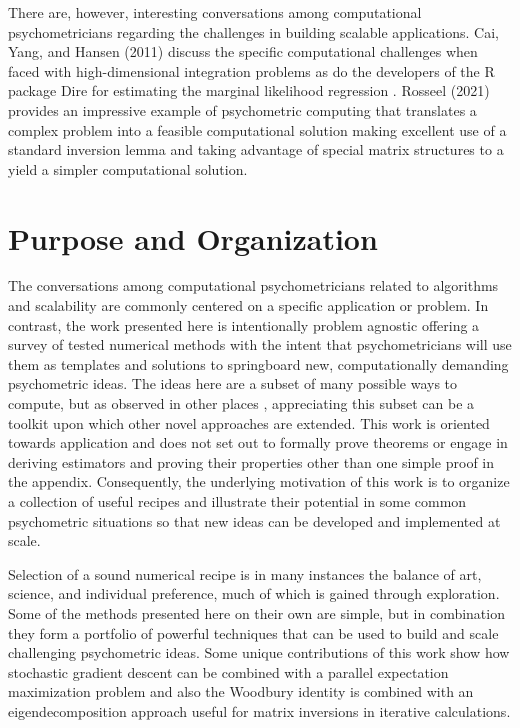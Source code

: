 \documentclass[12pt]{article}
\begin{document}
There are, however, interesting conversations among computational psychometricians regarding the challenges in building scalable applications. Cai, Yang, and Hansen (2011) discuss the specific computational challenges when faced with high-dimensional integration problems as do the developers of the R package Dire \cite{dire} for estimating the marginal likelihood regression \cite{mislevy}. Rosseel (2021) provides an impressive example of psychometric computing that translates a complex problem into a feasible computational solution making excellent use of a standard inversion lemma and taking advantage of special matrix structures to a yield a simpler computational solution.  \nocite{cai} \nocite{psych3020017}

\section*{Purpose and Organization}
The conversations among computational psychometricians related to algorithms and scalability are commonly centered on a specific application or problem. In contrast, the work presented here is intentionally problem agnostic offering a survey of tested numerical methods with the intent that psychometricians will use them as templates and solutions to springboard new, computationally demanding psychometric ideas. The ideas here are a subset of many possible ways to compute, but as observed in other places \cite{cai:fisher}, appreciating this subset can be a toolkit upon which other novel approaches are extended. This work is oriented towards application and does not set out to formally prove theorems or engage in deriving estimators and proving their properties other than one simple proof in the appendix. Consequently, the underlying motivation of this work is to organize a collection of useful recipes and illustrate their potential in some common psychometric situations so that new ideas can be developed and implemented at scale.

Selection of a sound numerical recipe is in many instances the balance of art, science, and individual preference, much of which is gained through exploration. Some of the methods presented here on their own are simple, but in combination they form a portfolio of powerful techniques that can be used to build and scale challenging psychometric ideas. Some unique contributions of this work show how stochastic gradient descent can be combined with a parallel expectation maximization problem and also the Woodbury identity is combined with an eigendecomposition approach useful for matrix inversions in iterative calculations.
\end{document}
